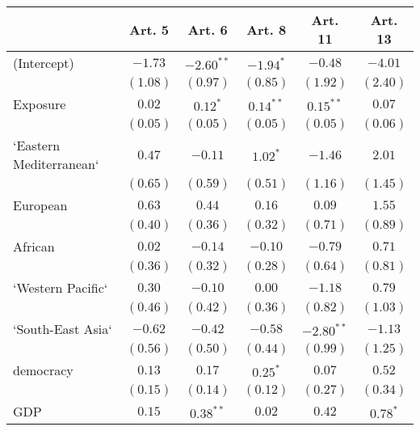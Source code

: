 
\begin{table}[!h]
\begin{center}
\begin{tabular}{l c c c c c }
\toprule
 & Art. 5 & Art. 6 & Art. 8 & Art. 11 & Art. 13 \\
\midrule
(Intercept)             & $-1.73$      & $-2.60^{**}$ & $-1.94^{*}$  & $-0.48$      & $-4.01$      \\
                        & $(1.08)$     & $(0.97)$     & $(0.85)$     & $(1.92)$     & $(2.40)$     \\
Exposure                & $0.02$       & $0.12^{*}$   & $0.14^{**}$  & $0.15^{**}$  & $0.07$       \\
                        & $(0.05)$     & $(0.05)$     & $(0.05)$     & $(0.05)$     & $(0.06)$     \\
`Eastern Mediterranean` & $0.47$       & $-0.11$      & $1.02^{*}$   & $-1.46$      & $2.01$       \\
                        & $(0.65)$     & $(0.59)$     & $(0.51)$     & $(1.16)$     & $(1.45)$     \\
European                & $0.63$       & $0.44$       & $0.16$       & $0.09$       & $1.55$       \\
                        & $(0.40)$     & $(0.36)$     & $(0.32)$     & $(0.71)$     & $(0.89)$     \\
African                 & $0.02$       & $-0.14$      & $-0.10$      & $-0.79$      & $0.71$       \\
                        & $(0.36)$     & $(0.32)$     & $(0.28)$     & $(0.64)$     & $(0.81)$     \\
`Western Pacific`       & $0.30$       & $-0.10$      & $0.00$       & $-1.18$      & $0.79$       \\
                        & $(0.46)$     & $(0.42)$     & $(0.36)$     & $(0.82)$     & $(1.03)$     \\
`South-East Asia`       & $-0.62$      & $-0.42$      & $-0.58$      & $-2.80^{**}$ & $-1.13$      \\
                        & $(0.56)$     & $(0.50)$     & $(0.44)$     & $(0.99)$     & $(1.25)$     \\
democracy               & $0.13$       & $0.17$       & $0.25^{*}$   & $0.07$       & $0.52$       \\
                        & $(0.15)$     & $(0.14)$     & $(0.12)$     & $(0.27)$     & $(0.34)$     \\
GDP                     & $0.15$       & $0.38^{**}$  & $0.02$       & $0.42$       & $0.78^{*}$   \\

\end{tabular}
\end{center}
\end{table}
